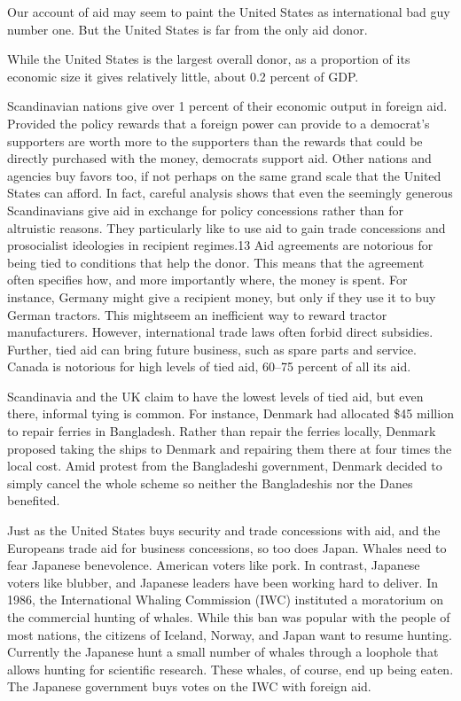 \documentclass[10pt]{article}
\begin{document}
{\large Our account of aid may seem to paint the United States as international
bad guy number one. But the United States is far from the only aid donor.}

{\large While the United States is the largest overall donor, as a proportion of
its economic size it gives relatively little, about 0.2 percent of GDP.}

{\large Scandinavian nations give over 1 percent of their economic output in
foreign aid. Provided the policy rewards that a foreign power can provide to a
democrat's supporters are worth more to the supporters than the rewards that
could be directly purchased with the money, democrats support aid. Other nations
and agencies buy favors too, if not perhaps on the same grand scale that the
United States can afford. In fact, careful analysis shows that even the seemingly
generous Scandinavians give aid in exchange for policy concessions rather than
for altruistic reasons. They particularly like to use aid to gain trade
concessions and prosocialist ideologies in recipient regimes.13 Aid agreements
are notorious for being tied to conditions that help the donor. This means that
the agreement often specifies how, and more importantly where, the money is
spent. For instance, Germany might give a recipient money, but only if they use
it to buy German tractors. This mightseem an inefficient way to reward tractor
manufacturers. However, international trade laws often forbid direct subsidies.
Further, tied aid can bring future business, such as spare parts and service.
Canada is notorious for high levels of tied aid, 60--75 percent of all its aid.}

{\large Scandinavia and the UK claim to have the lowest levels of tied aid, but
even there, informal tying is common. For instance, Denmark had allocated \$45
million to repair ferries in Bangladesh. Rather than repair the ferries locally,
Denmark proposed taking the ships to Denmark and repairing them there at four
times the local cost. Amid protest from the Bangladeshi government, Denmark
decided to simply cancel the whole scheme so neither the Bangladeshis nor the
Danes benefited.}

{\large Just as the United States buys security and trade concessions with aid,
and the Europeans trade aid for business concessions, so too does Japan. Whales
need to fear Japanese benevolence. American voters like pork. In contrast,
Japanese voters like blubber, and Japanese leaders have been working hard to
deliver. In 1986, the International Whaling Commission (IWC) instituted a
moratorium on the commercial hunting of whales. While this ban was popular with
the people of most nations, the citizens of Iceland, Norway, and Japan want to
resume hunting. Currently the Japanese hunt a small number of whales through a
loophole that allows hunting for scientific research. These whales, of course,
end up being eaten. The Japanese government buys votes on the IWC with foreign
aid.}
\end{document}
